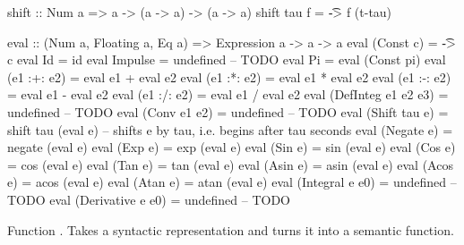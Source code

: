 \iffalse 
\begin{code}
data Expr x where
  Id         :: Expr a 
  Const      :: x         -> Expr x 
  --            f         -> f(0) -> f' 
  Derivative :: Expr x    -> x    -> Expr x
  ... 
\end{code}

\begin{code}
  Expression         %
  Id                 %
  Const c            %
  Derivative e e0    %
  
\end{code}


\fi 


\begin{codefig}
\begin{code}
shift :: Num a => a -> (a -> a) -> (a -> a)
shift tau f = \t -> f (t-tau)

eval :: (Num a, Floating a, Eq a) => Expression a -> a -> a
eval (Const c)           = \t -> c
eval Id                  = id
eval Impulse             = undefined -- TODO
eval Pi                  = eval (Const pi)
eval (e1 :+: e2)         = eval e1 + eval e2
eval (e1 :*: e2)         = eval e1 * eval e2
eval (e1 :-: e2)         = eval e1 - eval e2
eval (e1 :/: e2)         = eval e1 / eval e2
eval (DefInteg e1 e2 e3) = undefined -- TODO
eval (Conv       e1 e2)  = undefined -- TODO
eval (Shift tau e)       = shift tau (eval e) -- shifts e by tau, i.e. begins after tau seconds
eval (Negate e)          = negate (eval e)
eval (Exp e)             = exp    (eval e)
eval (Sin e)             = sin    (eval e)
eval (Cos e)             = cos    (eval e)
eval (Tan e)             = tan    (eval e)
eval (Asin e)            = asin   (eval e)
eval (Acos e)            = acos   (eval e)
eval (Atan e)            = atan   (eval e)
eval (Integral   e e0)   = undefined -- TODO
eval (Derivative e e0)   = undefined -- TODO
\end{code}
\caption{Function . Takes a syntactic representation and turns it into a semantic function.}\label{code:eval-def}
\end{codefig}



